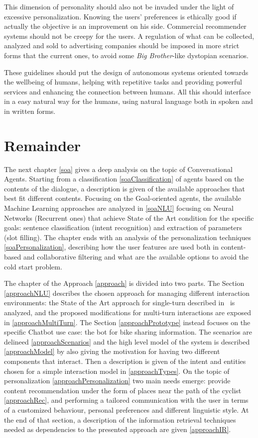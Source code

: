 This dimension of personality should also not be invaded under the light of excessive personalization. Knowing the users' preferences is ethically good if actually the objective is an improvement on his side. Commercial recommender systems should not be creepy for the users. A regulation of what can be collected, analyzed and sold to advertising companies should be imposed in more strict forms that the current ones, to avoid some \textit{Big Brother}-like dystopian scenarios.

These guidelines should put the design of autonomous systems oriented towards the wellbeing of humans, helping with repetitive tasks and providing powerful services and enhancing the connection between humans. All this should interface in a easy natural way for the humans, using natural language both in spoken and in written forms.

\section{Remainder}
The next chapter \ref{soa} gives a deep analysis on the topic of Conversational Agents. Starting from a classification \ref{soaClassification} of agents based on the contents of the dialogue, a description is given of the available approaches that best fit different contents. Focusing on the Goal-oriented agents, the available Machine Learning approaches are analyzed in \ref{soaNLU} focusing on Neural Networks (Recurrent ones) that achieve State of the Art condition for the specific goals: sentence classification (intent recognition) and extraction of parameters (slot filling). The chapter ends with an analysis of the personalization techniques \ref{soaPersonalization}, describing how the user features are used both in content-based and collaborative filtering and what are the available options to avoid the cold start problem.

The chapter of the Approach \ref{approach} is divided into two parts. The Section \ref{approachNLU} describes the chosen approach for managing different interaction environments: the State of the Art approach for single-turn described in~\cite{liu2016attention} is analyzed, and the proposed modifications for multi-turn interactions are exposed in \ref{approachMultiTurn}. The Section \ref{approachPrototype} instead focuses on the specific Chatbot use case: the bot for bike sharing information. The scenarios are delineed \ref{approachScenarios} and the high level model of the system is described \ref{approachModel} by also giving the motivation for having two different components that interact. Then a description is given of the intent and entities chosen for a simple interaction model in \ref{approachTypes}. On the topic of personalization \ref{approachPersonalization} two main needs emerge: provide content recommendation under the form of places near the path of the cyclist \ref{approachRec}, and performing a tailored communication with the user in terms of a customized behaviour, personal preferences and different linguistic style. At the end of that section, a description of the information retrieval techniques needed as dependencies to the presented approach are given \ref{approachIR}.

